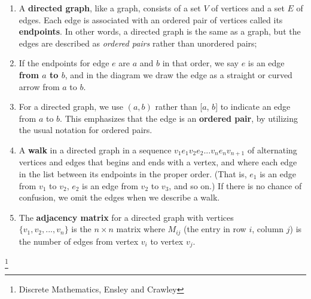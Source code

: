 \documentclass[a4paper,12pt]{book}
\begin{document}
    \begin{introNOHEAD}{}
        \begin{enumerate}
            \item   A \textbf{directed graph}, like a graph, consists of
                    a set $V$ of vertices and a set $E$ of edges.
                    Each edge is associated with an ordered pair of
                    vertices called its \textbf{endpoints}.
                    In other words, a directed graph is the same as a graph,
                    but the edges are described as \textit{ordered pairs}
                    rather than unordered pairs;

            \item   If the endpoints for edge $e$ are $a$ and $b$ in that order,
                    we say $e$ is an edge \textbf{from $a$ to $b$}, and
                    in the diagram we draw the edge as a straight or curved
                    arrow from $a$ to $b$.

            \item   For a directed graph, we use $(a,b)$ rather than
                    [$a$, $b$] to indicate an edge from $a$ to $b$.
                    This emphasizes that the edge is an \textbf{ordered pair},
                    by utilizing the usual notation for ordered pairs.

            \item   A \textbf{walk} in a directed graph in a sequence
                    $v_{1}e_{1} v_{2}e_{2} ... v_{n}e_{n} v_{n+1}$
                    of alternating vertices and edges that begins and
                    ends with a vertex, and where each edge in the
                    list between its endpoints in the proper order.
                    (That is, $e_{1}$ is an edge from $v_{1}$ to $v_{2}$,
                    $e_{2}$ is an edge from $v_{2}$ to $v_{3}$, and so on.)
                    If there is no chance of confusion, we omit the
                    edges when we describe a walk.

            \item   The \textbf{adjacency matrix} for a directed graph
                    with vertices \\ $\{ v_{1}, v_{2}, ..., v_{n} \}$ is
                    the $n \times n$ matrix where $M_{ij}$ (the entry
                    in row $i$, column $j$) is the number of edges
                    from vertex $v_{i}$ to vertex $v_{j}$.
        \end{enumerate}
        \footnote{Discrete Mathematics, Ensley and Crawley}
    \end{introNOHEAD}
\end{document}
